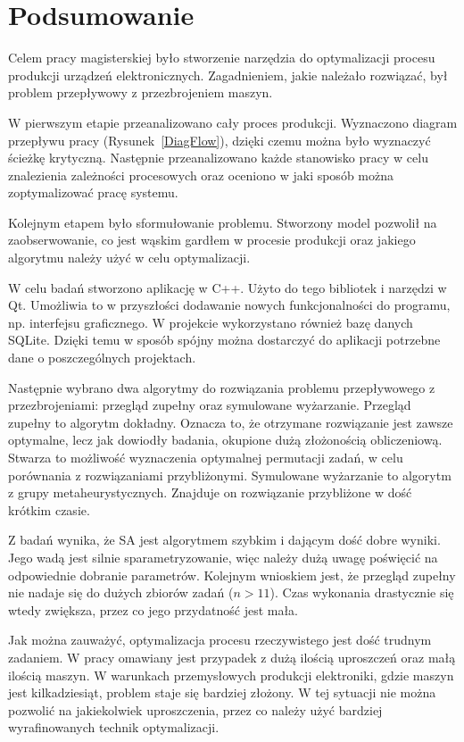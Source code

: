 \chapter{Podsumowanie}

Celem pracy magisterskiej było stworzenie narzędzia do optymalizacji procesu produkcji urządzeń elektronicznych. Zagadnieniem, jakie należało rozwiązać, był problem przepływowy z przezbrojeniem maszyn.

W pierwszym etapie przeanalizowano cały proces produkcji. Wyznaczono diagram przepływu pracy (Rysunek~\ref{DiagFlow}), dzięki czemu można było wyznaczyć ścieżkę krytyczną. Następnie przeanalizowano każde stanowisko pracy w celu znalezienia zależności procesowych oraz oceniono w jaki sposób można zoptymalizować pracę systemu.

Kolejnym etapem było sformułowanie problemu. Stworzony model pozwolił na zaobserwowanie, co jest wąskim gardłem w procesie produkcji oraz jakiego algorytmu należy użyć w celu optymalizacji.

W celu badań stworzono aplikację w C++. Użyto do tego bibliotek i narzędzi w Qt. Umożliwia to w przyszłości dodawanie nowych funkcjonalności do programu, np. interfejsu graficznego. W projekcie wykorzystano również bazę danych SQLite. Dzięki temu w sposób spójny można dostarczyć do aplikacji potrzebne dane o poszczególnych projektach.

Następnie wybrano dwa algorytmy do rozwiązania problemu przepływowego z przezbrojeniami: przegląd zupełny oraz symulowane wyżarzanie. Przegląd zupełny to algorytm dokładny. Oznacza to, że otrzymane rozwiązanie jest zawsze optymalne, lecz jak dowiodły badania, okupione dużą złożonością obliczeniową. Stwarza to możliwość wyznaczenia optymalnej permutacji zadań, w celu porównania z rozwiązaniami przybliżonymi. Symulowane wyżarzanie to algorytm z grupy metaheurystycznych. Znajduje on rozwiązanie przybliżone w dość krótkim czasie.

Z badań wynika, że SA jest algorytmem szybkim i dającym dość dobre wyniki. Jego wadą jest silnie sparametryzowanie, więc należy dużą uwagę poświęcić na odpowiednie dobranie parametrów. Kolejnym wnioskiem jest, że przegląd zupełny nie nadaje się do dużych zbiorów zadań ($n>11$). Czas wykonania drastycznie się wtedy zwiększa, przez co jego przydatność jest mała.

Jak można zauważyć, optymalizacja procesu rzeczywistego jest dość trudnym zadaniem. W pracy omawiany jest przypadek z dużą ilością uproszczeń oraz małą ilością maszyn. W warunkach przemysłowych produkcji elektroniki, gdzie maszyn jest kilkadziesiąt, problem staje się bardziej złożony. W tej sytuacji nie można pozwolić na jakiekolwiek uproszczenia, przez co należy użyć bardziej wyrafinowanych technik optymalizacji.